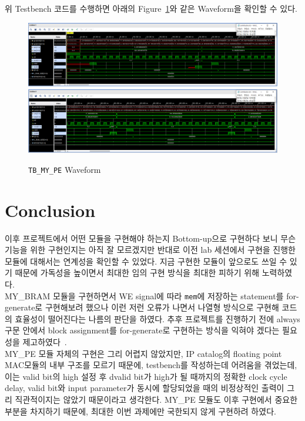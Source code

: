 \documentclass{article}
\begin{document}
위 Testbench 코드를 수행하면 아래의 Figure~\ref{fig3}와 같은 Waveform을 확인할 수 있다. 
\begin{figure}[ht]
	\centering
	\includegraphics[width=1.0\textwidth]{../../submission/MY_PE/MY_PE_Waveform1.png}
	\includegraphics[width=1.0\textwidth]{../../submission/MY_PE/MY_PE_Waveform2.png}
\caption{\texttt{TB\_MY\_PE} Waveform}
\label{fig3}
\end{figure}

\section{Conclusion}

이후 프로젝트에서 어떤 모듈을 구현해야 하는지 Bottom-up으로 구현하다 보니 무슨 기능을 위한 구현인지는 아직 잘 모르겠지만 반대로 이전 lab 세션에서 구현을 진행한 모듈에 대해서는 연계성을 확인할 수 있었다. 지금 구현한 모듈이 앞으로도 쓰일 수 있기 때문에 가독성을 높이면서 최대한 임의 구현 방식을 최대한 피하기 위해 노력하였다. \\

MY\_BRAM 모듈을 구현하면서 WE signal에 따라 \texttt{mem}에 저장하는 statement를 for-generate로 구현해보려 했으나 이런 저런 오류가 나면서 나열형 방식으로 구현해 코드의 효율성이 떨어진다는 나름의 판단을 하였다. 추후 프로젝트를 진행하기 전에 always 구문 안에서 block assignment를 for-generate로 구현하는 방식을 익혀야 겠다는 필요성을 제고하였다~\cite{thomas2008verilog}.\\

MY\_PE 모듈 자체의 구현은 그리 어렵지 않았지만, IP catalog의 floating point MAC모듈의 내부 구조를 모르기 때문에, testbench를 작성하는데 어려움을 겪었는데, 이는 valid bit의 high 설정 후 dvalid bit가 high가 될 때까지의 정확한 clock cycle delay, valid bit와 input parameter가 동시에 할당되었을 때의 비정상적인 출력이 그리 직관적이지는 않았기 때문이라고 생각한다. MY\_PE 모듈도 이후 구현에서 중요한 부분을 차지하기 때문에, 최대한 이번 과제에만 국한되지 않게 구현하려 하였다. 



\end{document}
